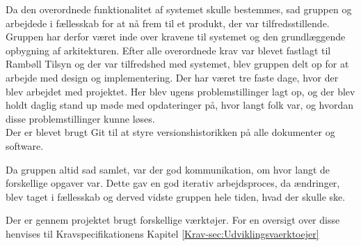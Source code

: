 Da den overordnede funktionalitet af systemet skulle bestemmes, sad gruppen og arbejdede i fællesskab for at nå frem til et produkt, der var tilfredsstillende. Gruppen har derfor været inde over kravene til systemet og den grundlæggende opbygning af arkitekturen.
Efter alle overordnede krav var blevet fastlagt til Rambøll Tilsyn og der var tilfredshed med systemet, blev gruppen delt op for at arbejde med design og implementering.
Der har været tre faste dage, hvor der blev arbejdet med projektet. Her blev ugens problemstillinger lagt op, og der blev holdt daglig stand up møde med opdateringer på, hvor langt folk var, og hvordan disse problemstillinger kunne løses. \\
Der er blevet brugt Git til at styre versionshistorikken på alle dokumenter og software. 

Da gruppen altid sad samlet, var der god kommunikation, om hvor langt de forskellige opgaver var.
Dette gav en god iterativ arbejdsproces, da ændringer, blev taget i fællesskab og derved vidste gruppen hele tiden, hvad der skulle ske.

Der er gennem projektet brugt forskellige værktøjer. For en oversigt over disse henvises til Kravspecifikationens Kapitel \ref{Krav-sec:Udviklingsvaerktoejer}
